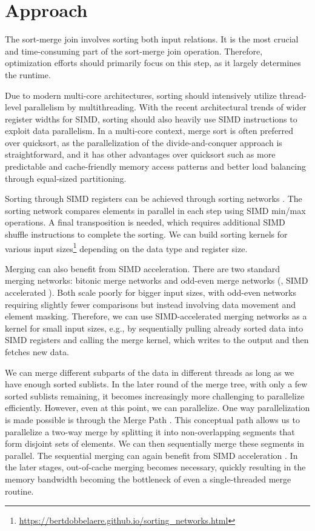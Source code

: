 \section{Approach}
\label{sec:approach}


The sort-merge join involves sorting both input relations. It is the most crucial and 
time-consuming part of the sort-merge join operation. Therefore, optimization efforts should
primarily focus on this step, as it largely determines the runtime. 

Due to modern multi-core 
architectures, sorting should intensively utilize thread-level parallelism by multithreading.
With the recent architectural trends of wider register widths for SIMD, sorting should also
heavily use SIMD instructions to exploit data parallelism. In a multi-core context, merge
sort is often preferred over quicksort, as the parallelization of the divide-and-conquer approach
is straightforward, and it has other advantages over quicksort such as more predictable and 
cache-friendly memory access patterns and better load balancing through equal-sized partitioning. 

Sorting through SIMD registers can be achieved through sorting networks \cite{10.1145/1468075.1468121}.
The sorting network compares elements in parallel in each step using SIMD min/max operations. 
A final transposition is needed, which requires additional SIMD shuffle instructions to complete
the sorting. We can build
sorting kernels for various input sizes\footnote{\url{https://bertdobbelaere.github.io/sorting_networks.html}} depending on the data type and register size. 

Merging can
also benefit from SIMD acceleration. There are two standard merging networks: bitonic merge networks
and odd-even merge networks (\cite{10.1145/1468075.1468121}, SIMD accelerated \cite{4336211}).
Both scale poorly for bigger input sizes, with odd-even networks 
requiring slightly fewer comparisons but instead involving data movement and element masking.
Therefore, we can use SIMD-accelerated merging networks as a kernel for small input sizes, e.g., by
sequentially pulling already sorted data into SIMD registers and calling the merge kernel, which 
writes to the output and then fetches new data.

We can merge different subparts of the data in
different threads as long as we have enough sorted sublists. In the later round of the merge tree,
with only a few sorted sublists remaining, it becomes increasingly more challenging to parallelize
efficiently. However, even at this point, we can parallelize. One way parallelization is made possible 
is through the Merge Path \cite{MergePath}. This conceptual path allows us to parallelize a two-way merge by splitting
it into non-overlapping segments that form disjoint sets of elements. We can then sequentially
merge these segments in parallel. The sequential merging can again benefit from SIMD acceleration \cite{Watkins}.
In the later stages, out-of-cache merging becomes necessary, quickly resulting in the memory
bandwidth becoming the bottleneck of even a single-threaded merge routine. 

